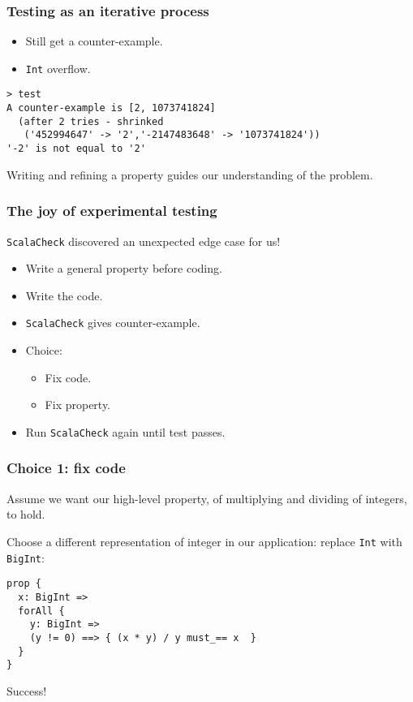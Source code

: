 \begin{frame}[fragile]
  \frametitle{Testing as an iterative process}

  \begin{itemize}
    \item Still get a counter-example.
    \item \texttt{Int} overflow.
  \end{itemize}

  \begin{verbatim}
> test
A counter-example is [2, 1073741824]
  (after 2 tries - shrinked
   ('452994647' -> '2','-2147483648' -> '1073741824'))
'-2' is not equal to '2'
  \end{verbatim}

  Writing and refining a property guides our understanding of the problem.
\end{frame}

\begin{frame}
  \frametitle{The joy of experimental testing}

  \texttt{ScalaCheck} discovered an unexpected edge case for us!

  \begin{itemize}
    \item<1-> Write a general property before coding.
    \item<2-> Write the code.
    \item<3-> \texttt{ScalaCheck} gives counter-example.
    \item<4-> Choice:
      \begin{itemize}
        \item<5-> Fix code.
        \item<5-> Fix property.
      \end{itemize}
    \item<6-> Run \texttt{ScalaCheck} again until test passes.
  \end{itemize}
\end{frame}

\begin{frame}[fragile]
  \frametitle{Choice 1: fix code}

  Assume we want our high-level property, of multiplying and dividing of integers, to hold.

  Choose a different representation of integer in our application: replace \texttt{Int} with \texttt{BigInt}:

  \begin{verbatim}
prop {
  x: BigInt =>
  forAll {
    y: BigInt =>
    (y != 0) ==> { (x * y) / y must_== x  }
  }
}
  \end{verbatim}

  Success!
\end{frame}

